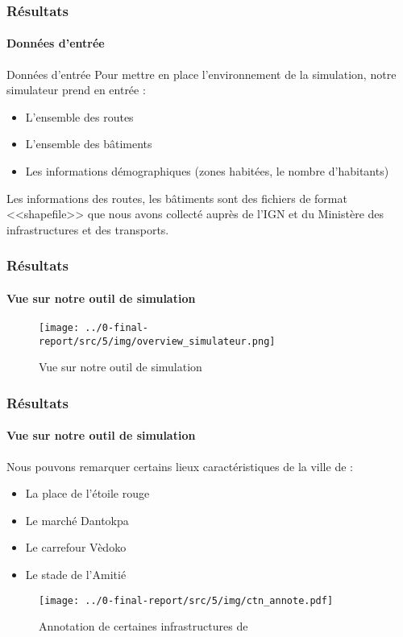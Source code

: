 \begin{frame}
    \frametitle{Résultats}
    \framesubtitle{Données d'entrée}

    \begin{block}{Données d'entrée}
        Pour mettre en place l'environnement de la simulation, notre simulateur prend en entrée :
        \begin{itemize}
            \item L'ensemble des routes
            \item L'ensemble des bâtiments
            \item Les informations démographiques (zones habitées, le nombre d'habitants)
        \end{itemize}

        Les informations des routes, les bâtiments sont des fichiers de format <<shapefile>> que nous avons collecté auprès de l'IGN et du Ministère des infrastructures et des transports.

    \end{block}

\end{frame}

\begin{frame}
    \frametitle{Résultats}
    \framesubtitle{Vue sur notre outil de simulation}

    \begin{figure}[h]
        \centering
        \texttt{[image: ../0-final-report/src/5/img/overview\_simulateur.png]}
        \caption{Vue sur notre outil de simulation}
        \label{fig:simulateur-overview}
    \end{figure}

\end{frame}

\begin{frame}
    \frametitle{Résultats}
    \framesubtitle{Vue sur notre outil de simulation}

    Nous pouvons remarquer certains lieux caractéristiques de la ville de \ctn{}:
    \begin{itemize}
        \item La place de l'étoile rouge
        \item Le marché Dantokpa
        \item Le carrefour Vèdoko
        \item Le stade de l'Amitié
    \end{itemize}
    \begin{figure}[h]
        \centering
        \texttt{[image: ../0-final-report/src/5/img/ctn\_annote.pdf]}
        \caption{Annotation de certaines infrastructures de \ctn{}}
        \label{fig:ctn-anotated}
    \end{figure}

\end{frame}



